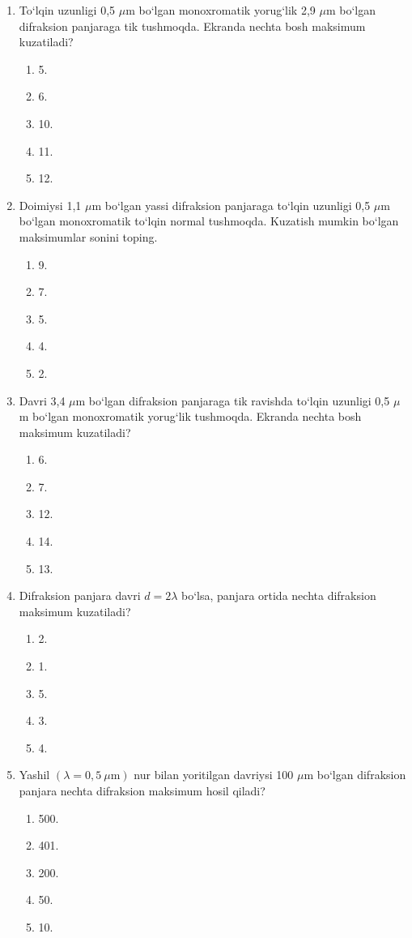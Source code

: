 \begin{enumerate}
\item To‘lqin uzunligi 0,5 $\mu$m bo‘lgan monoxromatik yorug‘lik 2,9 $\mu$m bo‘lgan difraksion panjaraga tik tushmoqda. Ekranda nechta bosh maksimum kuzatiladi?
\begin{enumerate}[label=\Alph*)]
\item 5.
\item 6.
\item 10.
\item 11.
\item 12.
\end{enumerate}

\item Doimiysi 1,1 $\mu$m bo‘lgan yassi difraksion panjaraga to‘lqin uzunligi 0,5 $\mu$m bo‘lgan monoxromatik to‘lqin normal tushmoqda. Kuzatish mumkin bo‘lgan maksimumlar sonini toping.
\begin{enumerate}[label=\Alph*)]
\item 9.
\item 7.
\item 5.
\item 4.
\item 2.
\end{enumerate}

\item Davri 3,4 $\mu$m bo‘lgan difraksion panjaraga tik ravishda to‘lqin uzunligi 0,5 $\mu$m bo‘lgan monoxromatik yorug‘lik tushmoqda. Ekranda nechta bosh maksimum kuzatiladi?
\begin{enumerate}[label=\Alph*)]
\item 6.
\item 7.
\item 12.
\item 14.
\item 13.
\end{enumerate}

\item Difraksion panjara davri $d=2\lambda$ bo‘lsa, panjara ortida nechta difraksion maksimum kuzatiladi?
\begin{enumerate}[label=\Alph*)]
\item 2.
\item 1.
\item 5.
\item 3.
\item 4.
\end{enumerate}

\item Yashil $(\lambda=0{,}5~\mu\text{m})$ nur bilan yoritilgan davriysi 100 $\mu$m bo‘lgan difraksion panjara nechta difraksion maksimum hosil qiladi?
\begin{enumerate}[label=\Alph*)]
\item 500.
\item 401.
\item 200.
\item 50.
\item 10.
\end{enumerate}


\end{enumerate}
